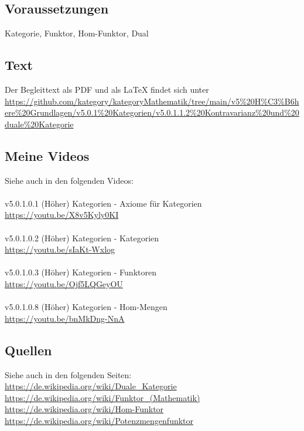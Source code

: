 \documentclass[a4paper]{amsart}
\theoremstyle{definition}
\begin{document}
\subsection*{Voraussetzungen}
Kategorie, Funktor, Hom-Funktor, Dual

\subsection*{Text}
Der Begleittext als PDF und als LaTeX findet sich unter
{\tiny
   \url{https://github.com/kategory/kategoryMathematik/tree/main/v5%20H%C3%B6here%20Grundlagen/v5.0.1%20Kategorien/v5.0.1.1.2%20Kontravarianz%20und%20duale%20Kategorie}
}

\subsection*{Meine Videos}
Siehe auch in den folgenden Videos:\\
\\
v5.0.1.0.1 (Höher) Kategorien - Axiome für Kategorien\\
\url{https://youtu.be/X8v5Kyly0KI}\\
\\
v5.0.1.0.2 (Höher) Kategorien - Kategorien\\
\url{https://youtu.be/sIaKt-Wxlog}\\
\\
v5.0.1.0.3 (Höher) Kategorien - Funktoren\\
\url{https://youtu.be/Ojf5LQGeyOU}\\
\\
v5.0.1.0.8 (Höher) Kategorien - Hom-Mengen\\
\url{https://youtu.be/bnMkDng-NnA}

\subsection*{Quellen}
Siehe auch in den folgenden Seiten:\\
\url{https://de.wikipedia.org/wiki/Duale_Kategorie}\\
\url{https://de.wikipedia.org/wiki/Funktor_(Mathematik)}\\
\url{https://de.wikipedia.org/wiki/Hom-Funktor}\\
\url{https://de.wikipedia.org/wiki/Potenzmengenfunktor}
\end{document}
